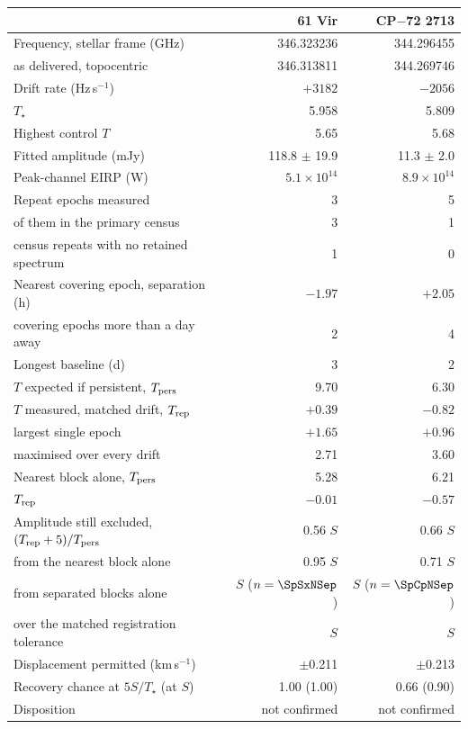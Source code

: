 \begin{tabular}{@{}>{\raggedright\arraybackslash}p{}@{~~}r@{~~}r@{}}
\hline
 & 61 Vir & CP$-$72 2713 \\
\hline
Frequency, stellar frame (GHz) & 346.323236 & 344.296455 \\
\quad as delivered, topocentric & 346.313811 & 344.269746 \\
Drift rate (Hz\,s$^{-1}$) & $+3182$ & $-2056$ \\
$T_\star$ & 5.958 & 5.809 \\
Highest control $T$ & 5.65 & 5.68 \\
Fitted amplitude (mJy) & 118.8 $\pm$ 19.9 & 11.3 $\pm$ 2.0 \\
Peak-channel EIRP (W) & $5.1 \times 10^{14}$ & $8.9 \times 10^{14}$ \\
Repeat epochs measured & 3 & 5 \\
\quad of them in the primary census & 3 & 1 \\
\quad census repeats with no retained spectrum & 1 & 0 \\
Nearest covering epoch, separation (h) & $-1.97$ & $+2.05$ \\
\quad covering epochs more than a day away & 2 & 4 \\
Longest baseline (d) & 3 & 2 \\
$T$ expected if persistent, $T_{\rm pers}$ & 9.70 & 6.30 \\
$T$ measured, matched drift, $T_{\rm rep}$ & $+0.39$ & $-0.82$ \\
\quad largest single epoch & $+1.65$ & $+0.96$ \\
\quad maximised over every drift & 2.71 & 3.60 \\
Nearest block alone, $T_{\rm pers}$ & 5.28 & 6.21 \\
\quad $T_{\rm rep}$ & $-0.01$ & $-0.57$ \\
Amplitude still excluded, $(T_{\rm rep}+5)/T_{\rm pers}$ & 0.56 $S$ & 0.66 $S$ \\
\quad from the nearest block alone & 0.95 $S$ & 0.71 $S$ \\
\quad from separated blocks alone & \SpSxFracSep{} $S$ ($n=\SpSxNSep$) & \SpCpFracSep{} $S$ ($n=\SpCpNSep$) \\
\quad over the matched registration tolerance & \SpSxFracTol{} $S$ & \SpCpFracTol{} $S$ \\
Displacement permitted (km\,s$^{-1}$) & $\pm$0.211 & $\pm$0.213 \\
Recovery chance at $5S/T_\star$ (at $S$) & 1.00 (1.00) & 0.66 (0.90) \\
Disposition & not confirmed & not confirmed \\
\hline
\end{tabular}
